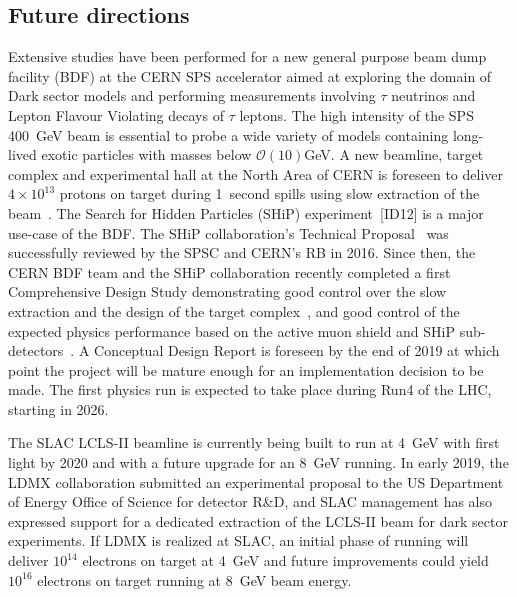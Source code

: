 \documentclass[../report.tex]{subfiles}
\begin{document}
\subsection{Future directions}
Extensive studies have been performed for a new general purpose beam dump facility (BDF) at the CERN SPS accelerator aimed at exploring the domain of Dark sector models and performing measurements involving $\tau$ neutrinos and Lepton Flavour Violating decays of $\tau$ leptons. The high intensity of the SPS 400~GeV beam is essential to probe a wide variety of models containing long-lived exotic particles with masses below $\mathcal{O}(10)$GeV. A new beamline, target complex and experimental hall at the North Area of CERN is foreseen to deliver $4\times10^{13}$ protons on target during 1~second spills using slow extraction of the beam~\cite{Ahdida:2650896}. The Search for Hidden Particles (SHiP) experiment~[ID12] is a major use-case of the BDF. %
The SHiP collaboration's Technical Proposal~\cite{Anelli:2015pba} was successfully reviewed by the SPSC and CERN's RB in 2016. Since then, the CERN BDF team and the SHiP collaboration recently completed a first Comprehensive Design Study demonstrating good control over the slow extraction and the design of the target complex~\cite{Ahdida:2650896}, and good control of the expected physics performance based on the active muon shield and SHiP sub-detectors~\cite{Ahdida:2654870}. A Conceptual Design Report is foreseen by the end of 2019 at which point the project will be mature enough for an implementation decision to be made. The first physics run is expected to take place during Run4 of the LHC, starting in 2026.

The SLAC LCLS-II beamline is currently being built to run at 4~GeV with first light by 2020 and with a future upgrade for an 8~GeV running. In early 2019, the LDMX collaboration submitted an experimental proposal to the US Department of Energy Office of Science for detector R\&D, and SLAC management has also expressed support for a dedicated extraction of the LCLS-II beam for dark sector experiments. If LDMX is realized at SLAC, an initial phase of running will deliver $10^{14}$ electrons on target at 4~GeV and future improvements could yield $10^{16}$ electrons on target running at 8~GeV beam energy. 
\end{document}
